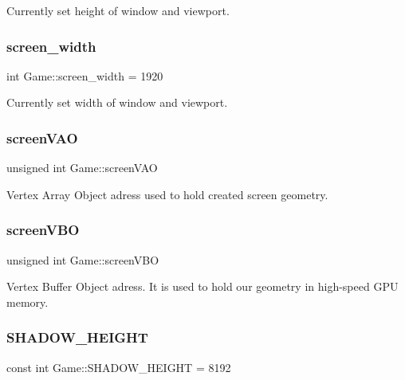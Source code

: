 Currently set height of window and viewport. 

\mbox{\label{class_game_ac05df6adfb712932bac2afea1fb01dc3}} 
\subsubsection{\texorpdfstring{screen\_width}{screen\_width}}
{\footnotesize\ttfamily int Game\+::screen\+\_\+width = 1920\hspace{0.3cm}{\ttfamily [protected]}}



Currently set width of window and viewport. 

\mbox{\label{class_game_a92aabad09ef89df6964b62b89c2f7edb}} 
\subsubsection{\texorpdfstring{screenVAO}{screenVAO}}
{\footnotesize\ttfamily unsigned int Game\+::screen\+V\+AO\hspace{0.3cm}{\ttfamily [protected]}}



Vertex Array Object adress used to hold created screen geometry. 

\mbox{\label{class_game_a64dfde0688161bc1d584fc448c496e49}} 
\subsubsection{\texorpdfstring{screenVBO}{screenVBO}}
{\footnotesize\ttfamily unsigned int Game\+::screen\+V\+BO\hspace{0.3cm}{\ttfamily [protected]}}



Vertex Buffer Object adress. It is used to hold our geometry in high-\/speed G\+PU memory. 

\mbox{\label{class_game_a6ff4bf491706f3c85c1de2ed7983a51b}} 
\subsubsection{\texorpdfstring{SHADOW\_HEIGHT}{SHADOW\_HEIGHT}}
{\footnotesize\ttfamily const int Game\+::\+S\+H\+A\+D\+O\+W\+\_\+\+H\+E\+I\+G\+HT = 8192\hspace{0.3cm}{\ttfamily [protected]}}



